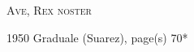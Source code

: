 \documentclass[10pt, letterpaper]{article}
\begin{document}
\newcommand{\red}[1]{\textcolor{red}{#1}}

\begin{center}\begin{huge}\textsc{Ave, Rex noster}\end{huge}\end{center}
\begin{center}1950 Graduale (Suarez), page(s) 70*\end{center}


\def\greinitialformat#1{%
{\fontsize{31}{31}\selectfont #1}%
}

\gresetfirstlineaboveinitial{\small \textbf{}}{\small \textbf{}}
\commentary{{\small \emph{}}}

\grespaceabovelines=3mm

\end{document}
